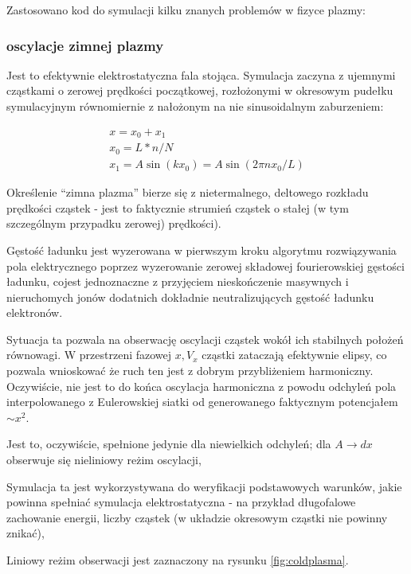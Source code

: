     Zastosowano kod do symulacji kilku znanych problemów w fizyce plazmy:
    \subsubsection{oscylacje zimnej plazmy}
    Jest to efektywnie elektrostatyczna fala stojąca. Symulacja zaczyna z ujemnymi cząstkami
o zerowej prędkości początkowej, rozłożonymi w okresowym pudełku symulacyjnym
równomiernie z nałożonym na nie sinusoidalnym zaburzeniem:

\begin{align}
x = x_0 + x_1\\
x_0 = L * n / N\\
x_1 = A  \sin(k x_0)=A \sin(2 \pi n x_0 / L)
\end{align}

Określenie ``zimna plazma'' bierze się z nietermalnego, deltowego
rozkładu prędkości cząstek - jest to faktycznie strumień cząstek o stałej
(w tym szczególnym przypadku zerowej) prędkości).

Gęstość ładunku jest wyzerowana w pierwszym kroku algorytmu rozwiązywania pola elektrycznego
poprzez wyzerowanie zerowej składowej fourierowskiej gęstości ładunku, cojest jednoznaczne
z przyjęciem nieskończenie masywnych i nieruchomych jonów dodatnich dokładnie neutralizujących gęstość
ładunku elektronów.

Sytuacja ta
pozwala na obserwację oscylacji cząstek wokół ich stabilnych położeń
równowagi. W przestrzeni fazowej $x, V_x$ cząstki zataczają efektywnie
elipsy, co pozwala wnioskować że ruch ten jest z dobrym przybliżeniem harmoniczny.
Oczywiście, nie jest to do końca oscylacja harmoniczna z powodu odchyleń pola interpolowanego
z Eulerowskiej siatki od generowanego faktycznym potencjałem $ \sim x^2 $.

Jest to, oczywiście, spełnione jedynie dla niewielkich odchyleń; dla $A \to
dx$  obserwuje się nieliniowy reżim oscylacji, %


Symulacja ta jest wykorzystywana do weryfikacji podstawowych warunków, jakie powinna spełniać
symulacja elektrostatyczna - na przykład długofalowe zachowanie energii, liczby cząstek (w układzie okresowym cząstki nie powinny
znikać), %

Liniowy reżim obserwacji jest zaznaczony na rysunku \ref{fig:coldplasma}.

